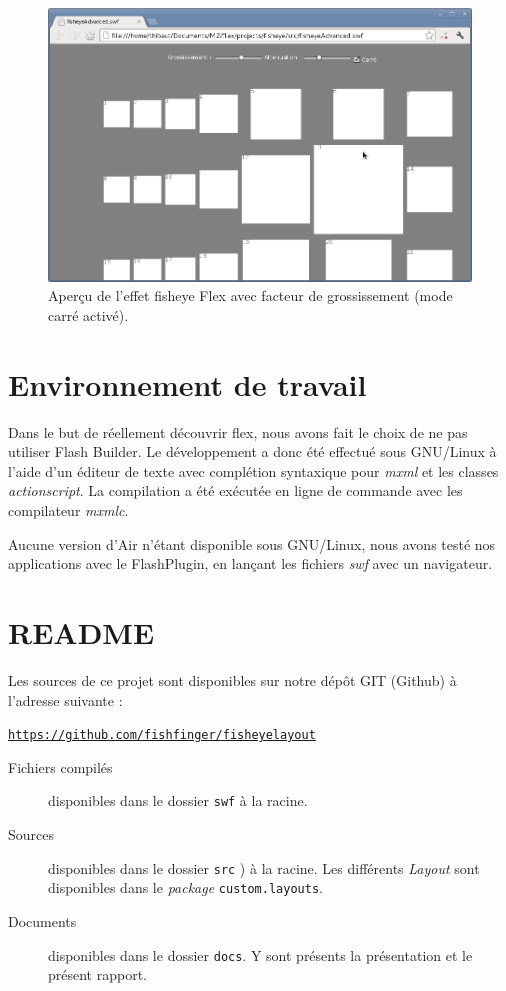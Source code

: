 \begin{minipage}[H]{.5\textwidth}
\begin{figure}[H]
  \centering
  \includegraphics[width=\textwidth]{../resources/illustrations/flex_screen_3}
  \caption{Aperçu de l'effet fisheye Flex avec facteur de grossissement (mode carré activé).}
  \label{fig:js_6}
\end{figure}
\end{minipage}

\section{Environnement de travail}

Dans le but de réellement découvrir flex, nous avons fait le choix de ne pas utiliser Flash Builder. Le développement a donc été effectué sous GNU/Linux à l'aide d'un éditeur de texte avec complétion syntaxique pour \emph{mxml} et les classes \emph{actionscript}. La compilation a été exécutée en ligne de commande avec les compilateur \emph{mxmlc}.

Aucune version d'Air n'étant disponible sous GNU/Linux, nous avons testé nos applications avec le FlashPlugin, en lançant les fichiers \emph{swf} avec un navigateur.

\section{README}
\label{sec:readme}
Les sources de ce projet sont disponibles sur notre dépôt GIT (Github) à l'adresse suivante :
\begin{center}
  \href{https://github.com/fishfinger/fisheyelayout}{\texttt{https://github.com/fishfinger/fisheyelayout}}
\end{center}

\begin{description}
  \item[Fichiers compilés] disponibles dans le dossier \texttt{swf} à la racine.
  \item[Sources] disponibles dans le dossier \texttt{src} ) à la racine. Les différents \emph{Layout} sont disponibles dans le \emph{package} \texttt{custom.layouts}.
  \item[Documents] disponibles dans le dossier \texttt{docs}. Y sont présents la présentation et le présent rapport.
\end{description}